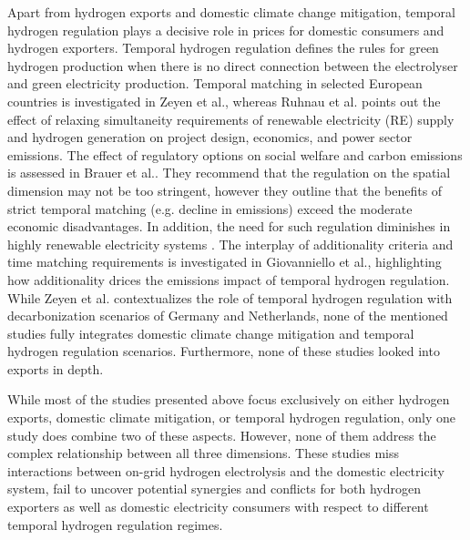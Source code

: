 Apart from hydrogen exports and domestic climate change mitigation, temporal hydrogen regulation plays a decisive role in prices for domestic consumers and hydrogen exporters. 
Temporal hydrogen regulation defines the rules for green hydrogen production when there is no direct connection between the electrolyser and green electricity production.
Temporal matching in selected European countries is investigated in Zeyen et al.\cite{Zeyen2024}, whereas Ruhnau et al.\cite{Ruhnau2023a} points out the effect of relaxing simultaneity requirements of renewable electricity (RE) supply and hydrogen generation on project design, economics, and power sector emissions.
The effect of regulatory options on social welfare and carbon emissions is assessed in Brauer et al.\cite{Brauer2022}. They recommend that the regulation on the spatial dimension may not be too stringent, however they outline that the benefits of strict temporal matching (e.g. decline in emissions) exceed the moderate economic disadvantages. In addition, the need for such regulation diminishes in highly renewable electricity systems \cite{Brauer2022}.
The interplay of additionality criteria and time matching requirements is investigated in Giovanniello et al.\cite{Giovanniello2024}, highlighting how additionality drices the emissions impact of temporal hydrogen regulation.
While Zeyen et al.\cite{Zeyen2024} contextualizes the role of temporal hydrogen regulation with decarbonization scenarios of Germany and Netherlands, none of the mentioned studies fully integrates domestic climate change mitigation and temporal hydrogen regulation scenarios. Furthermore, none of these studies looked into exports in depth.

While most of the studies presented above focus exclusively on either hydrogen exports, domestic climate mitigation, or temporal hydrogen regulation, only one study\cite{Muller2024} does combine two of these aspects. However, none of them address the complex relationship between all three dimensions. These studies miss interactions between on-grid hydrogen electrolysis and the domestic electricity system, fail to uncover potential synergies and conflicts for both hydrogen exporters as well as domestic electricity consumers with respect to different temporal hydrogen regulation regimes.


